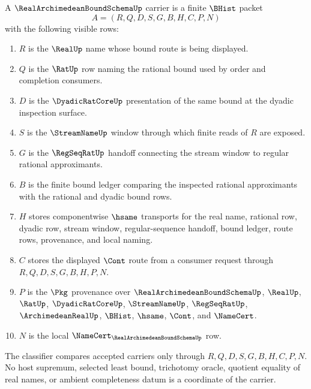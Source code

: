 \begin{definition}
\label{def:real-archimedean-bound-schema-carrier}
A $\RealArchimedeanBoundSchemaUp$ carrier is a finite $\BHist$ packet
$$
A=(R,Q,D,S,G,B,H,C,P,N)
$$
with the following visible rows:
\begin{enumerate}
\item $R$ is the $\RealUp$ name whose bound route is being displayed.
\item $Q$ is the $\RatUp$ row naming the rational bound used by order and completion consumers.
\item $D$ is the $\DyadicRatCoreUp$ presentation of the same bound at the dyadic inspection surface.
\item $S$ is the $\StreamNameUp$ window through which finite reads of $R$ are exposed.
\item $G$ is the $\RegSeqRatUp$ handoff connecting the stream window to regular rational approximants.
\item $B$ is the finite bound ledger comparing the inspected rational approximants with the rational and dyadic bound rows.
\item $H$ stores componentwise $\hsame$ transports for the real name, rational row, dyadic row, stream window, regular-sequence handoff, bound ledger, route rows, provenance, and local naming.
\item $C$ stores the displayed $\Cont$ route from a consumer request through $R,Q,D,S,G,B,H,P,N$.
\item $P$ is the $\Pkg$ provenance over $\RealArchimedeanBoundSchemaUp$, $\RealUp$, $\RatUp$, $\DyadicRatCoreUp$, $\StreamNameUp$, $\RegSeqRatUp$, $\ArchimedeanRealUp$, $\BHist$, $\hsame$, $\Cont$, and $\NameCert$.
\item $N$ is the local $\NameCert_{\RealArchimedeanBoundSchemaUp}$ row.
\end{enumerate}
The classifier compares accepted carriers only through $R,Q,D,S,G,B,H,C,P,N$. No host supremum, selected least bound, trichotomy oracle, quotient equality of real names, or ambient completeness datum is a coordinate of the carrier.
\end{definition}

